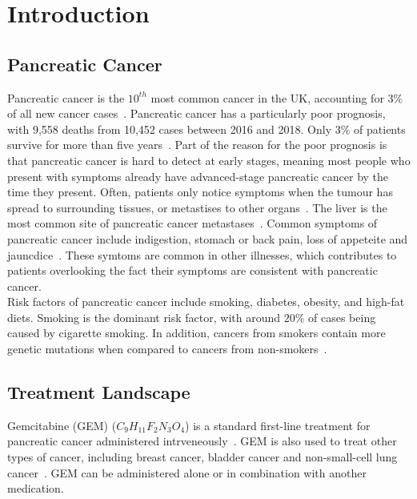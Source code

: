 \chapter{Introduction}

\section{Pancreatic Cancer}
Pancreatic cancer is the $10^{th}$ most common cancer in the UK, accounting for $3\%$ of all new cancer cases~\cite{pancStat}. Pancreatic cancer has a particularly poor prognosis, with 9,558 deaths from 10,452 cases between 2016 and 2018. Only $3\%$ of patients survive for more than five years~\cite{NG85}. Part of the reason for the poor prognosis is that pancreatic cancer is hard to detect at early stages, meaning most people who present with symptoms already have advanced-stage pancreatic cancer by the time they present. Often, patients only notice symptoms when the tumour has spread to surrounding tissues, or metastises to other organs~\cite{kelsen}. The liver is the most common site of pancreatic cancer metastases~\cite{deeb}. Common symptoms of pancreatic cancer include indigestion, stomach or back pain, loss of appeteite and jauncdice~\cite{pancSymp}. These symtoms are common in other illnesses, which contributes to patients overlooking the fact their symptoms are consistent with pancreatic cancer. \\

Risk factors of pancreatic cancer include smoking, diabetes, obesity, and high-fat diets. Smoking is the dominant risk factor, with around $20\%$ of cases being caused by cigarette smoking. In addition, cancers from smokers contain more genetic mutations when compared to cancers from non-smokers~\cite{blackford}. \\

\section{Treatment Landscape}
Gemcitabine (GEM) ($C_9H_{11}F_2N_3O_4$) is a standard first-line treatment for pancreatic cancer administered intrveneously~\cite{NG85}. GEM is also used to treat other types of cancer, including breast cancer, bladder cancer and non-small-cell lung cancer~\cite{wong2009}. GEM can be administered alone or in combination with another medication.\\


